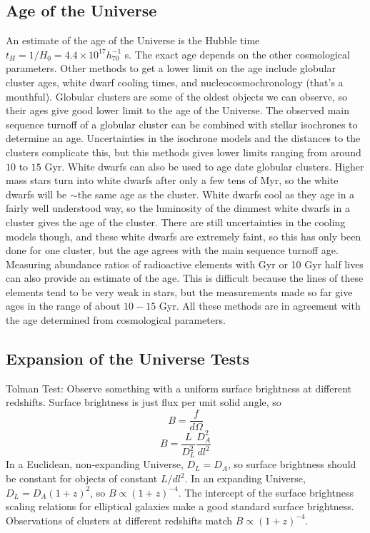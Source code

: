 \subsection{Age of the Universe}
An estimate of the age of the Universe is the Hubble time 
$t_H=1/H_0=4.4\times10^{17}h_{70}^{-1}$ s.  The exact age depends on the other 
cosmological parameters.  Other methods to get a lower limit on the age include 
globular cluster ages, white dwarf cooling times, and nucleocosmochronology 
(that's a mouthful).  Globular clusters are some of the oldest objects 
we can observe, so their ages give good lower limit to the age of the 
Universe.  The observed main sequence turnoff of a globular cluster can be 
combined with stellar isochrones to determine an age.  Uncertainties in 
the isochrone models and the distances to the clusters complicate this, 
but this methods gives lower limits ranging from around $10$ to $15$ Gyr.  
White dwarfs can also be used to age date globular clusters.  Higher 
mass stars turn into white dwarfs after only a few tens of Myr, so the 
white dwarfs will be $\sim$the same age as the cluster.  White dwarfs cool 
as they age in a fairly well understood way, so the luminosity of the 
dimmest white dwarfs in a cluster gives the age of the cluster.  There are 
still uncertainties in the cooling models though, and these white dwarfs are 
extremely faint, so this has only been done for one cluster, but the age 
agrees with the main sequence turnoff age.  Measuring abundance ratios of 
radioactive elements with Gyr or 10 Gyr half lives can also provide an estimate 
of the age.  This is difficult because the lines of these elements tend to be 
very weak in stars, but the measurements made so far give ages in the range of 
about $10-15$ Gyr.  All these methods are in agreement with the age determined 
from cosmological parameters.  

\subsection{Expansion of the Universe Tests}
Tolman Test:\newline
Observe something with a uniform surface brightness at different redshifts.  
Surface brightness is just flux per unit solid angle, so 
\begin{equation}
B=\frac{f}{d\Omega}
\end{equation}
\begin{equation}
B=\frac{L}{D_L^2}\frac{D_A^2}{dl^2}
\end{equation}
In a Euclidean, non-expanding Universe, $D_L=D_A$, so surface brightness should 
be constant for objects of constant $L/dl^2$.  In an expanding Universe, 
$D_L=D_A(1+z)^2$, so $B\propto(1+z)^{-4}$.  The intercept of the surface 
brightness scaling relations for elliptical galaxies make a good standard 
surface brightness.  Observations of clusters at different redshifts match 
$B\propto(1+z)^{-4}$.  

